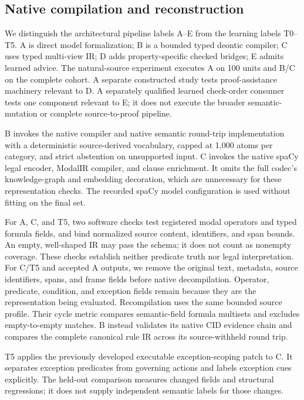 \documentclass{article}
\begin{document}
\subsection{Native compilation and reconstruction}
We distinguish the architectural pipeline labels A--E from the learning labels T0--T5. A is direct model formalization; B is a bounded typed deontic compiler; C uses typed multi-view IR; D adds property-specific checked bridges; E admits learned advice. The natural-source experiment executes A on 100 units and B/C on the complete cohort. A separate constructed study tests proof-assistance machinery relevant to D. A separately qualified learned check-order consumer tests one component relevant to E; it does not execute the broader semantic-mutation or complete source-to-proof pipeline.

B invokes the native compiler and native semantic round-trip implementation with a deterministic source-derived vocabulary, capped at 1,000 atoms per category, and strict abstention on unsupported input. C invokes the native spaCy legal encoder, ModalIR compiler, and clause enrichment. It omits the full codec's knowledge-graph and embedding decoration, which are unnecessary for these representation checks. The recorded spaCy model configuration is used without fitting on the final set.

For A, C, and T5, two software checks test registered modal operators and typed formula fields, and bind normalized source content, identifiers, and span bounds. An empty, well-shaped IR may pass the schema; it does not count as nonempty coverage. These checks establish neither predicate truth nor legal interpretation. For C/T5 and accepted A outputs, we remove the original text, metadata, source identifiers, spans, and frame fields before native decompilation. Operator, predicate, condition, and exception fields remain because they are the representation being evaluated. Recompilation uses the same bounded source profile. Their cycle metric compares semantic-field formula multisets and excludes empty-to-empty matches. B instead validates its native CID evidence chain and compares the complete canonical rule IR across its source-withheld round trip.

T5 applies the previously developed executable exception-scoping patch to C. It separates exception predicates from governing actions and labels exception cues explicitly. The held-out comparison measures changed fields and structural regressions; it does not supply independent semantic labels for those changes.
\end{document}
